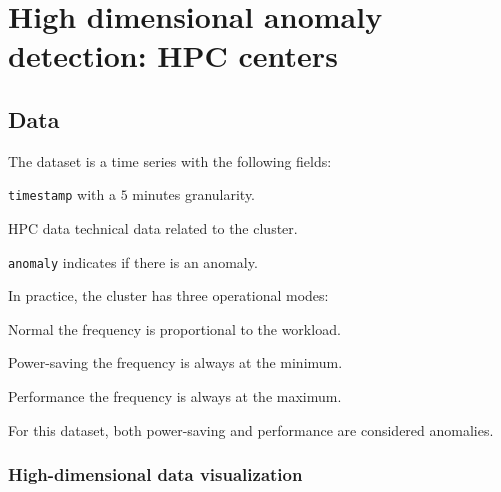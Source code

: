 \chapter{High dimensional anomaly detection: HPC centers}


\section{Data}

The dataset is a time series with the following fields:
\begin{descriptionlist}
    \item[\texttt{timestamp}] with a $5$ minutes granularity.
    \item[HPC data] technical data related to the cluster.
    \item[\texttt{anomaly}] indicates if there is an anomaly.
\end{descriptionlist}

In practice, the cluster has three operational modes:
\begin{descriptionlist}
    \item[Normal] the frequency is proportional to the workload.
    \item[Power-saving] the frequency is always at the minimum.
    \item[Performance] the frequency is always at the maximum.
\end{descriptionlist}
For this dataset, both power-saving and performance are considered anomalies.


\subsection{High-dimensional data visualization}

